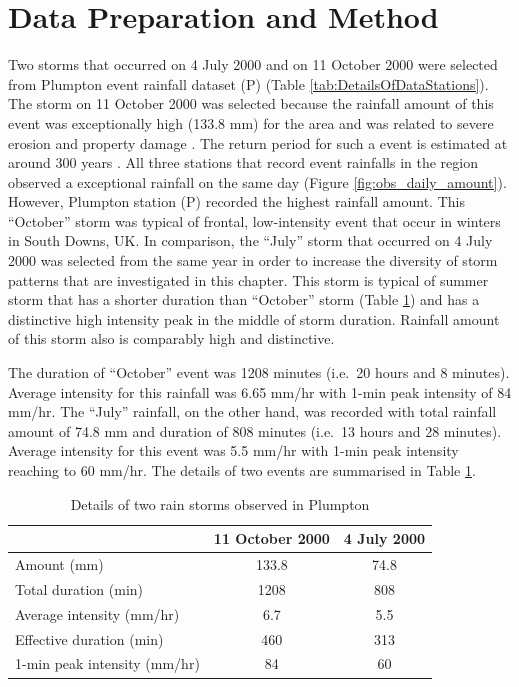\section{Data Preparation and Method}
\label{sec:TemporalScalesEffectsMethods}

Two storms that occurred on 4 July 2000 and on 11 October 2000 were selected
from Plumpton event rainfall dataset (P) (Table
\ref{tab:DetailsOfDataStations}). The storm on 11 October 2000 was selected
because the rainfall amount of this event was exceptionally high (133.8 mm) for
the area and was related to severe erosion and property damage
\citep{boardman2001-346}. The return period for such a event is estimated at
around 300 years \citep{saunders2001-360}. All three stations that record event
rainfalls in the region observed a exceptional rainfall on the same day (Figure
\ref{fig:obs_daily_amount}). However, Plumpton station (P) recorded the highest
rainfall amount. This ``October'' storm was typical of frontal, low-intensity
event that occur in winters in South Downs, UK. In comparison, the ``July''
storm that occurred on 4 July 2000 was selected from the same year in order to
increase the diversity of storm patterns that are investigated in this chapter.
This storm is typical of summer storm that has a shorter duration than
``October'' storm (Table \ref{tab:DetailsoftworainstormsobservedinPlumpton}) and
has a distinctive high intensity peak in the middle of storm duration. Rainfall
amount of this storm also is comparably high and distinctive.

The duration of ``October'' event was 1208 minutes (i.e.\ 20 hours and 8
minutes). Average intensity for this rainfall was 6.65 mm/hr with 1-min peak
intensity of 84 mm/hr. The ``July'' rainfall, on the other hand, was recorded
with total rainfall amount of 74.8 mm and duration of 808 minutes (i.e.\ 13
hours and 28 minutes). Average intensity for this event was 5.5 mm/hr with
1-min peak intensity reaching to 60 mm/hr. The details of two events are
summarised in Table \ref{tab:DetailsoftworainstormsobservedinPlumpton}.

\begin{table}[htbp]
  \centering
  \small
  \caption{Details of two rain storms observed in Plumpton}
  \label{tab:DetailsoftworainstormsobservedinPlumpton}
    \begin{tabular}{lcc}
    \toprule
     & 11 October 2000 & 4 July 2000 \\
    \midrule
    Amount (mm) & 133.8 & 74.8\\
    Total duration (min) & 1208 & 808 \\
    Average intensity (mm/hr) & 6.7 & 5.5 \\
    Effective duration (min) & 460 & 313 \\
    1-min peak intensity (mm/hr) & 84 & 60 \\
    \bottomrule
    \end{tabular}
\end{table}

